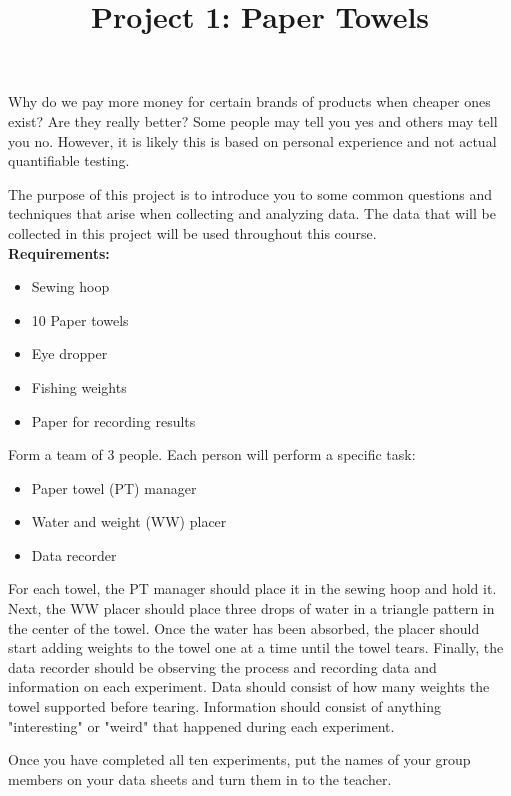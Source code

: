 \documentclass[12pt]{article}
\begin{document}
 
\title{Project 1: Paper Towels}
\date{}

\maketitle

Why do we pay more money for certain brands of products when cheaper ones exist? Are they really better? Some people may tell you yes and others may tell you no. However, it is likely this is based on personal experience and not actual quantifiable testing.

The purpose of this project is to introduce you to some common questions and techniques that arise when collecting and analyzing data. The data that will be collected in this project will be used throughout this course. \\

\noindent
\textbf{Requirements:}

\begin{itemize}
	\item Sewing hoop
	\item 10 Paper towels
	\item Eye dropper
	\item Fishing weights
	\item Paper for recording results
\end{itemize}

\noindent
Form a team of 3 people. Each person will perform a specific task:

\begin{itemize}
	\item{Paper towel (PT) manager}
	\item{Water and weight (WW) placer}
	\item{Data recorder}
\end{itemize}

For each towel, the PT manager should place it in the sewing hoop and hold it. Next, the WW placer should place three drops of water in a triangle pattern in the center of the towel. Once the water has been absorbed, the placer should start adding weights to the towel one at a time until the towel tears. Finally, the data recorder should be observing the process and recording data and information on each experiment. Data should consist of how many weights the towel supported before tearing. Information should consist of anything "interesting" or "weird" that happened during each experiment.

Once you have completed all ten experiments, put the names of your group members on your data sheets and turn them in to the teacher.
 
\end{document}

